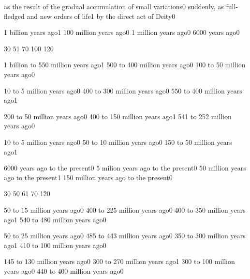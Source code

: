 {as the result of the gradual accumulation of small variations}{0}
{suddenly, as full\hyp{}fledged and new orders of life}{1}
{by the direct act of Deity}{0}
\qstop


{1 billion years ago}{1}
{100 million years ago}{0}
{1 million years ago}{0}
{6000 years ago}{0}
\qstop

{3}{0}
{5}{1}
{7}{0}
{10}{0}
{12}{0}
\qstop

{1 billion to 550 million years ago}{1}
{500 to 400 million years ago}{0}
{100 to 50 million years ago}{0}
\qstop

{10 to 5 million years ago}{0}
{400 to 300 million years ago}{0}
{550 to 400 million years ago}{1}
\qstop

{200 to 50 million years ago}{0}
{400 to 150 million years ago}{1}
{541 to 252 million years ago}{0}
\qstop

{10 to 5 million years ago}{0}
{50 to 10 million years ago}{0}
{150 to 50 million years ago}{1}
\qstop

{6000 years ago to the present}{0}
{5 milion years ago to the present}{0}
{50 million years ago to the present}{1}
{150 million years ago to the present}{0}
\qstop

{3}{0}
{5}{0}
{6}{1}
{7}{0}
{12}{0}
\qstop

{50 to 15 million years ago}{0}
{400 to 225 million years ago}{0}
{400 to 350 million years ago}{1}
{540 to 480 million years ago}{0}
\qstop

{50 to 25 million years ago}{0}
{485 to 443 million years ago}{0}
{350 to 300 million years ago}{1}
{410 to 100 million years ago}{0}
\qstop

{145 to 130 million years ago}{0}
{300 to 270 million years ago}{1}
{300 to 100 million years ago}{0}
{440 to 400 million years ago}{0}
\qstop

